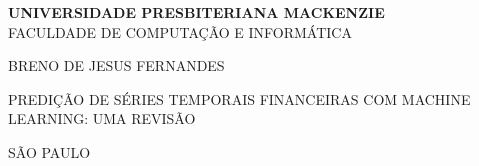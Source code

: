 \begin{titlepage}
	\centering

	\large \textbf{UNIVERSIDADE PRESBITERIANA MACKENZIE}\\
	\large FACULDADE DE COMPUTAÇÃO E INFORMÁTICA\\
	\vspace{2cm}

	\large BRENO DE JESUS FERNANDES\\
	\vspace{8cm}

	\large PREDIÇÃO DE SÉRIES TEMPORAIS FINANCEIRAS COM MACHINE LEARNING: UMA REVISÃO\\
	\vspace*{\fill}

    \large SÃO PAULO\\
    \large \the\year

	
\end{titlepage}